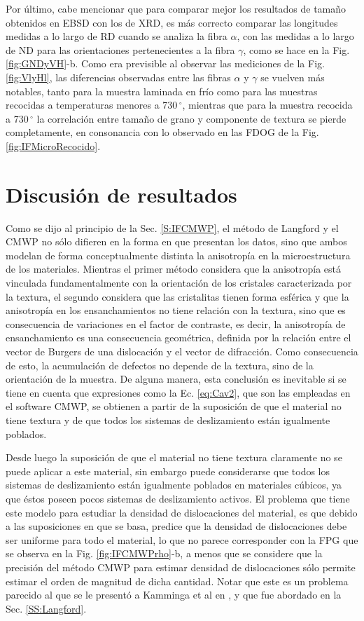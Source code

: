 Por último, cabe mencionar que para comparar mejor los resultados de tamaño obtenidos en EBSD con los de XRD, es más correcto comparar las longitudes medidas a lo largo de RD cuando se analiza la fibra $\alpha$, con las medidas a lo largo de ND para las orientaciones pertenecientes a la fibra $\gamma$, como se hace en la Fig. \ref{fig:GNDyVH}-b.
Como era previsible al observar las mediciones de la Fig. \ref{fig:VlyHl}, las diferencias observadas entre las fibras $\alpha$ y $\gamma$ se vuelven más notables, tanto para la muestra laminada en frío como para las muestras recocidas a temperaturas menores a 730\,$^{\circ}$, mientras que para la muestra recocida a 730\,$^{\circ}$ la correlación entre tamaño de grano y componente de textura se pierde completamente, en consonancia con lo observado en las FDOG de la Fig. \ref{fig:IFMicroRecocido}.

\section{Discusión de resultados}\label{S:IFDis}
Como se dijo al principio de la Sec. \ref{S:IFCMWP}, el método de Langford y el CMWP no sólo difieren en la forma en que presentan los datos, sino que ambos modelan de forma conceptualmente distinta la anisotropía en la microestructura de los materiales.
Mientras el primer método considera que la anisotropía está vinculada fundamentalmente con la orientación de los cristales caracterizada por la textura, el segundo considera que las cristalitas tienen forma esférica y que la anisotropía en los ensanchamientos no tiene relación con la textura, sino que es consecuencia de variaciones en el factor de contraste, es decir, la anisotropía de ensanchamiento es una consecuencia geométrica, definida por la relación entre el vector de Burgers de una dislocación y el vector de difracción.
Como consecuencia de esto, la acumulación de defectos no depende de la textura, sino de la orientación de la muestra.
De alguna manera, esta conclusión es inevitable si se tiene en cuenta que expresiones como la Ec. \ref{eq:Cav2}, que son las empleadas en el software CMWP, se obtienen a partir de la suposición de que el material no tiene textura y de que todos los sistemas de deslizamiento están igualmente poblados.

Desde luego la suposición de que el material no tiene textura claramente no se puede aplicar a este material, sin embargo puede considerarse que todos los sistemas de deslizamiento están igualmente poblados en materiales cúbicos, ya que éstos poseen pocos sistemas de deslizamiento activos.
El problema que tiene este modelo para estudiar la densidad de dislocaciones del material, es que debido a las suposiciones en que se basa, predice que la densidad de dislocaciones debe ser uniforme para todo el material, lo que no parece corresponder con la FPG que se observa en la Fig. \ref{fig:IFCMWPrho}-b, a menos que se considere que la precisión del método CMWP para estimar densidad de dislocaciones sólo permite estimar el orden de magnitud de dicha cantidad.
Notar que este es un problema parecido al que se le presentó a Kamminga et al en \cite{mittemeijer2003diffraction}, y que fue abordado en la Sec. \ref{SS:Langford}.


